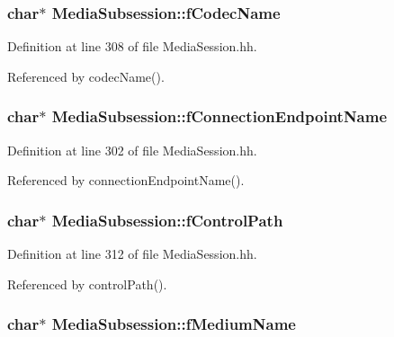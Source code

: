 \subsubsection[{f\+Codec\+Name}]{\setlength{\rightskip}{0pt plus 5cm}char$\ast$ Media\+Subsession\+::f\+Codec\+Name\hspace{0.3cm}{\ttfamily [protected]}}\label{classMediaSubsession_a3134352dfc94cfc66c629f6dd240aac8}


Definition at line 308 of file Media\+Session.\+hh.



Referenced by codec\+Name().

\subsubsection[{f\+Connection\+Endpoint\+Name}]{\setlength{\rightskip}{0pt plus 5cm}char$\ast$ Media\+Subsession\+::f\+Connection\+Endpoint\+Name\hspace{0.3cm}{\ttfamily [protected]}}\label{classMediaSubsession_a486441ec328f6cd7ead32afdf7b76fa0}


Definition at line 302 of file Media\+Session.\+hh.



Referenced by connection\+Endpoint\+Name().

\subsubsection[{f\+Control\+Path}]{\setlength{\rightskip}{0pt plus 5cm}char$\ast$ Media\+Subsession\+::f\+Control\+Path\hspace{0.3cm}{\ttfamily [protected]}}\label{classMediaSubsession_abf29db75d11e4b03a9f113eb44195cf3}


Definition at line 312 of file Media\+Session.\+hh.



Referenced by control\+Path().

\subsubsection[{f\+Medium\+Name}]{\setlength{\rightskip}{0pt plus 5cm}char$\ast$ Media\+Subsession\+::f\+Medium\+Name\hspace{0.3cm}{\ttfamily [protected]}}\label{classMediaSubsession_a2684b03162b0f4afc77b57f4f1eea753}


